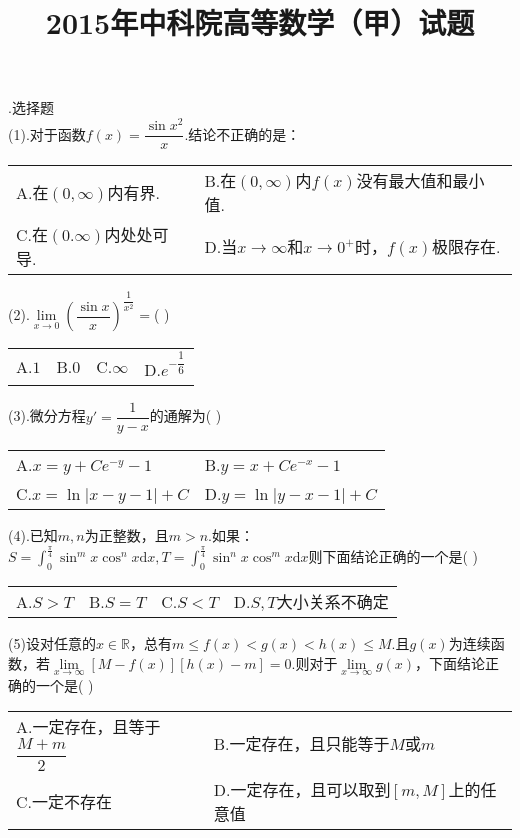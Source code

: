 \documentclass[UTF8]{ctexart}
\date{}
\author{}
\begin{document}
\title{2015年中科院高等数学（甲）试题}
\maketitle
\thispagestyle{empty}


.选择题\\
(1).对于函数$ f(x)=\dfrac{\sin{x^2}}{x} $.结论不正确的是：\\
\begin{tabular}{ll}
	A.在$ (0,\infty) $内有界.&
	B.在$ (0,\infty) $内$ f(x) $没有最大值和最小值.\\
	C.在$ (0.\infty) $内处处可导.&
	D.当$ x\rightarrow\infty $和$ x\rightarrow0^+ $时，$ f(x) $极限存在.
\end{tabular}


\noindent(2).$ \lim\limits_{x\rightarrow0}(\dfrac{\sin{x}}{x})^{\dfrac{1}{x^2}} = $(	)\\
\begin{tabular}{llll}
	A.$ 1 $& B.$ 0 $& C.$ \infty $& D.$ e^{-\dfrac{1}{6}} $
\end{tabular}


\noindent(3).微分方程$ y'=\dfrac{1}{y-x} $的通解为(	)\\
\begin{tabular}{ll}
	A.$ x=y+Ce^{-y}-1 $&
	B.$ y=x+Ce^{-x}-1 $\\
	C.$ x=\ln\left|x-y-1\right|+C $&
	D.$ y=\ln\left|y-x-1\right|+C$
\end{tabular}


\noindent(4).已知$ m,n $为正整数，且$ m>n $.如果：$ S=\int_{0}^{\frac{\pi}{4}}\sin^m{x}\cos^n{x}\mathrm{d}x,T=\int_{0}^{\frac{\pi}{4}}\sin^n{x}\cos^m{x}\mathrm{d}x $则下面结论正确的一个是(	)\\
\begin{tabular}{llll}
	A.$ S>T $& B.$ S=T $& C.$ S<T $& D.$ S,T $大小关系不确定
\end{tabular}


\noindent(5)设对任意的$ x\in\mathbb{R} $，总有$ m\le f(x)<g(x)<h(x)\le M $.且$ g(x) $为连续函数，若$ \lim\limits_{x\rightarrow\infty}[M-f(x)][h(x)-m]=0. $则对于$ \lim\limits_{x\rightarrow\infty}g(x) $，下面结论正确的一个是(	)\\
\begin{tabular}{ll}
	A.一定存在，且等于$ \dfrac{M+m}{2} $&
	B.一定存在，且只能等于$ M $或$ m $\\
	C.一定不存在&
	D.一定存在，且可以取到$ [m,M] $上的任意值
\end{tabular}
\end{document}
